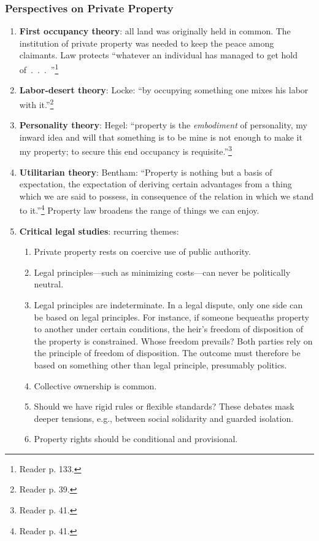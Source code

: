 \subsubsection{Perspectives on Private Property}

\begin{enumerate}
    \item \textbf{First occupancy theory}: all land was originally held in 
    common. The institution of private property was needed to keep the peace 
    among claimants. Law protects ``whatever an individual has managed to get 
    hold of~.~.~.~''\footnote{Reader p. 133.}
    \item \textbf{Labor-desert theory}: Locke: ``by occupying something one 
    mixes his labor with it.''\footnote{Reader p. 39.}
    \item \textbf{Personality theory}: Hegel: ``property is the 
    \emph{embodiment} of personality, my inward idea and will that something 
    is to be mine is not enough to make it my property; to secure this end 
    occupancy is requisite.''\footnote{Reader p. 41.}
    \item \textbf{Utilitarian theory}: Bentham: ``Property is nothing but a 
    basis of expectation, the expectation of deriving certain advantages from 
    a thing which we are said to possess, in consequence of the relation in 
    which we stand to it.''\footnote{Reader p. 41.} Property law broadens the 
    range of things we can enjoy.
    \item \textbf{Critical legal studies}: recurring themes:
    \begin{enumerate}
        \item Private property rests on coercive use of public authority.
        \item Legal principles---such as minimizing costs---can never be 
        politically neutral.
        \item Legal principles are indeterminate. In a legal dispute, only one 
        side can be based on legal principles. For instance, if someone 
        bequeaths property to another under certain conditions, the heir's 
        freedom of disposition of the property is constrained. Whose freedom 
        prevails? Both parties rely on the principle of freedom of 
        disposition. The outcome must therefore be based on something other 
        than legal principle, presumably politics.
        \item Collective ownership is common.
        \item Should we have rigid rules or flexible standards? These debates 
        mask deeper tensions, e.g., between social solidarity and guarded 
        isolation.
        \item Property rights should be conditional and provisional.
    \end{enumerate}
\end{enumerate}

